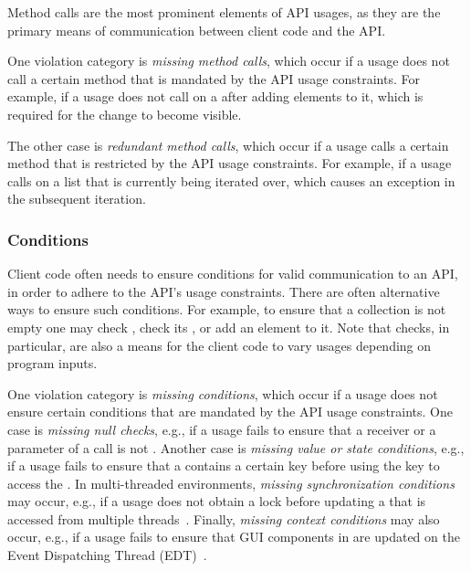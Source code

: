 Method calls are the most prominent elements of API usages, as they are the primary means of communication between client code and the API.

One violation category is \emph{missing method calls}, which occur if a usage does not call a certain method that is mandated by the API usage constraints.
For example, if a usage does not call  on a  after adding elements to it, which is required for the change to become visible.

The other case is \emph{redundant method calls}, which occur if a usage calls a certain method that is restricted by the API usage constraints.
For example, if a usage calls  on a list that is currently being iterated over, which causes an exception in the subsequent iteration.


\subsubsection*{Conditions}

Client code often needs to ensure conditions for valid communication to an API, in order to adhere to the API's usage constraints.
There are often alternative ways to ensure such conditions.
For example, to ensure that a collection is not empty one may check , check its , or add an element to it.
Note that checks, in particular, are also a means for the client code to vary usages depending on program inputs.

One violation category is \emph{missing conditions}, which occur if a usage does not ensure certain conditions that are mandated by the API usage constraints.
One case is \emph{missing null checks}, e.g., if a usage fails to ensure that a receiver or a parameter of a call is not .
Another case is \emph{missing value or state conditions}, e.g., if a usage fails to ensure that a  contains a certain key before using the key to access the .
In multi-threaded environments, \emph{missing synchronization conditions} may occur, e.g., if a usage does not obtain a lock before updating a  that is accessed from multiple threads~\cite{METM12}.
Finally, \emph{missing context conditions} may also occur, e.g., if a usage fails to ensure that GUI components in  are updated on the Event Dispatching Thread (EDT)~\cite{DH09}.

